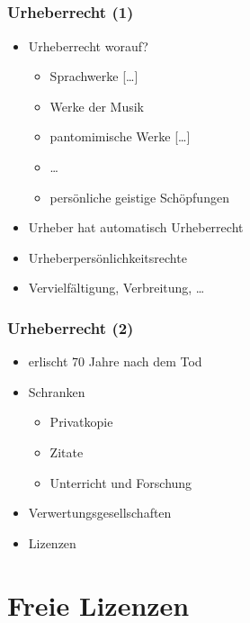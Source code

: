 \documentclass[table]{beamer}
\begin{document}
\subsection{}

\begin{frame}
  \frametitle{Urheberrecht (1)}
    \begin{itemize}
        \item<2-> Urheberrecht worauf?
        \begin{itemize}
          \item<3-> Sprachwerke [\dots]
          \item<4-> Werke der Musik
          \item<5-> pantomimische Werke [\dots]
          \item<6-> \dots
          \item<7-> persönliche geistige Schöpfungen
        \end{itemize}
      \item<8-> Urheber hat automatisch Urheberrecht
      \item<9-> Urheberpersönlichkeitsrechte
      \item<10-> Vervielfältigung, Verbreitung, \dots
    \end{itemize}
\end{frame}

\begin{frame}
  \frametitle{Urheberrecht (2)}
    \begin{itemize}
        \item<2-> erlischt 70 Jahre nach dem Tod
        \item<3-> Schranken
        \begin{itemize}
          \item<4-> Privatkopie
          \item<5-> Zitate
          \item<6-> Unterricht und Forschung
        \end{itemize}
        \item<7-> Verwertungsgesellschaften
        \item<8-> Lizenzen
    \end{itemize}
\end{frame}

\section{Freie Lizenzen}
\subsection{}
\end{document}
